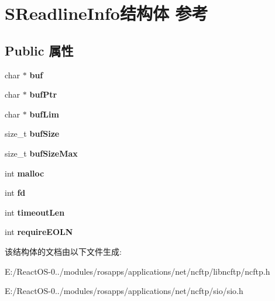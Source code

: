 \hypertarget{struct_s_readline_info}{}\section{S\+Readline\+Info结构体 参考}
\label{struct_s_readline_info}
\subsection*{Public 属性}
\begin{DoxyCompactItemize}
\item 
\mbox{\label{struct_s_readline_info_ad20af6a1e990b778c62ef1dd59515818}} 
char $\ast$ {\bfseries buf}
\item 
\mbox{\label{struct_s_readline_info_a185e63ffa3c240a9206d3f0dce054b69}} 
char $\ast$ {\bfseries buf\+Ptr}
\item 
\mbox{\label{struct_s_readline_info_a0386cce3ca8c2e22b34df8eeacc81834}} 
char $\ast$ {\bfseries buf\+Lim}
\item 
\mbox{\label{struct_s_readline_info_a82228af650edf501b8268f49c636b7ac}} 
size\+\_\+t {\bfseries buf\+Size}
\item 
\mbox{\label{struct_s_readline_info_aa8acefd2cff718fe6daf42d5d130aca3}} 
size\+\_\+t {\bfseries buf\+Size\+Max}
\item 
\mbox{\label{struct_s_readline_info_afc31d26fde7f14762ce224d3a5b3ca4b}} 
int {\bfseries malloc}
\item 
\mbox{\label{struct_s_readline_info_a8fe219f70654e8fadec759db4275a92d}} 
int {\bfseries fd}
\item 
\mbox{\label{struct_s_readline_info_a37a0245ae63052551cf0295b3d2eefc8}} 
int {\bfseries timeout\+Len}
\item 
\mbox{\label{struct_s_readline_info_af4567a828e84f596c563b018ad68c969}} 
int {\bfseries require\+E\+O\+LN}
\end{DoxyCompactItemize}


该结构体的文档由以下文件生成\+:\begin{DoxyCompactItemize}
\item 
E\+:/\+React\+O\+S-\/0../modules/rosapps/applications/net/ncftp/libncftp/ncftp.\+h\item 
E\+:/\+React\+O\+S-\/0../modules/rosapps/applications/net/ncftp/sio/sio.\+h\end{DoxyCompactItemize}
